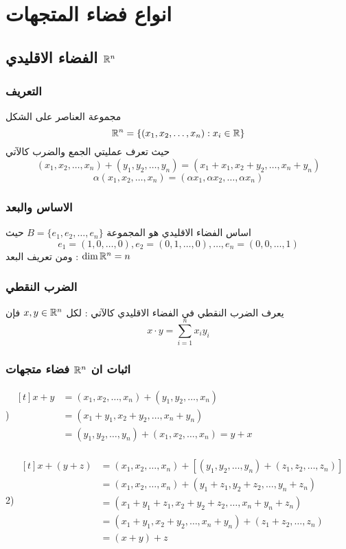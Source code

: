 \chapter{انواع فضاء المتجهات}

\section{الفضاء الاقليدي $\mathbb{R}^n$}
\subsection{التعريف}

مجموعة العناصر على الشكل
\[
\mathbb{R}^n = \{(x_1, x_2, \dots, x_n) : x_i \in \mathbb{R}\}
\]
حيث تعرف عمليتي الجمع والضرب كالآتي
\[
(x_1, x_2, \dots, x_n) + (y_1, y_2, \dots, y_n)  = (x_1+x_1, x_2+y_2, \dots, x_n+y_n) 
\]  
\[
\alpha (x_1, x_2, \dots, x_n)  = (\alpha x_1,\alpha x_2, \dots, \alpha x_n) 
\]

\subsection{الاساس والبعد}
اساس الفضاء الاقليدي هو المجموعة $B = \{e_1, e_2, \dots, e_n \}$
حيث 
\[
e_1 = (1,0,\dots,0) , e_2 = (0,1,\dots,0) , \dots , e_n = (0,0,\dots,1)
\]
ومن تعريف البعد : $\dim\mathbb{R}^n = n$

\subsection{الضرب النقطي}
يعرف الضرب النقطي في الفضاء الاقليدي كالآتي : لكل $x, y\in \mathbb{R}^n$ فإن
\[
x \cdot y = \sum_{i=1}^{n} x_i y_i
\]

\subsection{اثبات ان $\mathbb{R}^n$ فضاء متجهات}

) $
\begin{aligned}[t]
	x + y &= (x_1, x_2, \dots, x_n) + (y_1, y_2, \dots, x_n)\\
	&= (x_1+y_1, x_2+y_2, \dots, x_n + y_n)\\
	&= (y_1, y_2, \dots, y_n) + (x_1, x_2, \dots, x_n) = y + x
\end{aligned}
$\\ \\
2) $
\begin{aligned}[t]
	x + (y + z) &= (x_1, x_2, \dots, x_n) + [(y_1, y_2, \dots, y_n) + (z_1, z_2, \dots, z_n)]\\
	&= (x_1, x_2, \dots, x_n) + (y_1+z_1, y_2+z_2, \dots, y_n+z_n)\\
	&=  (x_1+y_1+z_1, x_2+y_2+z_2, \dots, x_n+y_n+z_n)\\
	&=  (x_1+y_1, x_2+y_2, \dots, x_n+y_n) + (z_1+z_2,\dots,z_n)\\
	&= (x+y) + z
\end{aligned}
$\\

